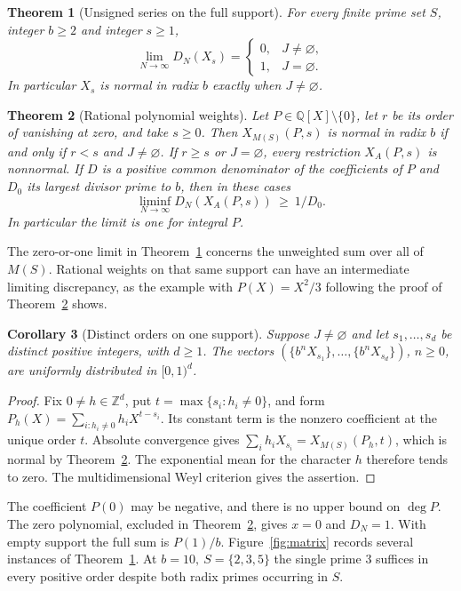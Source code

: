 \documentclass[11pt]{article}
\newtheorem{theorem}{Theorem}[section]
\newtheorem{corollary}[theorem]{Corollary}
\newcommand{\Z}{\mathbb Z}
\newcommand{\Q}{\mathbb Q}
\begin{document}
\begin{theorem}[Unsigned series on the full support]\label{thm:unsigned}
For every finite prime set \(S\), integer \(b\ge2\) and integer \(s\ge1\),
\[
 \lim_{N\to\infty}D_N(X_s)=
 \begin{cases}0,&J\ne\varnothing,\\1,&J=\varnothing.\end{cases}
\]
In particular \(X_s\) is normal in radix \(b\) exactly when \(J\ne\varnothing\).
\end{theorem}

\begin{theorem}[Rational polynomial weights]\label{thm:polynomial}
Let \(P\in\Q[X]\setminus\{0\}\), let \(r\) be its order of vanishing at zero, and take \(s\ge0\). Then \(X_{M(S)}(P,s)\) is normal in radix \(b\) if and only if \(r<s\) and \(J\ne\varnothing\). If \(r\ge s\) or \(J=\varnothing\), every restriction \(X_A(P,s)\) is nonnormal. If \(D\) is a positive common denominator of the coefficients of \(P\) and \(D_0\) its largest divisor prime to \(b\), then in these cases
\[
 \liminf_{N\to\infty} D_N(X_A(P,s))\ \ge\ 1/D_0 .
\]
In particular the limit is one for integral \(P\).
\end{theorem}

The zero-or-one limit in Theorem~\ref{thm:unsigned} concerns the unweighted sum over all of \(M(S)\). Rational weights on that same support can have an intermediate limiting discrepancy, as the example with \(P(X)=X^2/3\) following the proof of Theorem~\ref{thm:polynomial} shows.

\begin{corollary}[Distinct orders on one support]\label{cor:orders}
Suppose \(J\ne\varnothing\) and let \(s_1,\ldots,s_d\) be distinct positive integers, with \(d\ge1\). The vectors \((\{b^nX_{s_1}\},\ldots,\{b^nX_{s_d}\})\), \(n\ge0\), are uniformly distributed in \([0,1)^d\).
\end{corollary}
\begin{proof}
Fix \(0\ne h\in\Z^d\), put \(t=\max\{s_i:h_i\ne0\}\), and form \(P_h(X)=\sum_{i:h_i\ne0}h_iX^{t-s_i}\). Its constant term is the nonzero coefficient at the unique order \(t\). Absolute convergence gives \(\sum_i h_iX_{s_i}=X_{M(S)}(P_h,t)\), which is normal by Theorem~\ref{thm:polynomial}. The exponential mean for the character \(h\) therefore tends to zero. The multidimensional Weyl criterion gives the assertion.
\end{proof}

The coefficient \(P(0)\) may be negative, and there is no upper bound on \(\deg P\). The zero polynomial, excluded in Theorem~\ref{thm:polynomial}, gives \(x=0\) and \(D_N=1\). With empty support the full sum is \(P(1)/b\). Figure~\ref{fig:matrix} records several instances of Theorem~\ref{thm:unsigned}. At \(b=10,\ S=\{2,3,5\}\) the single prime 3 suffices in every positive order despite both radix primes occurring in \(S\).
\end{document}
